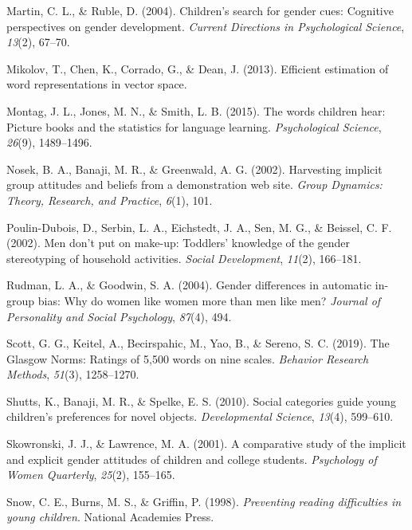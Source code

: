 \documentclass[english,,man,floatsintext]{apa6}
\begin{document}
\leavevmode\hypertarget{ref-martin2004children}{}%
Martin, C. L., \& Ruble, D. (2004). Children's search for gender cues: Cognitive perspectives on gender development. \emph{Current Directions in Psychological Science}, \emph{13}(2), 67--70.

\leavevmode\hypertarget{ref-mikolov2013efficient}{}%
Mikolov, T., Chen, K., Corrado, G., \& Dean, J. (2013). Efficient estimation of word representations in vector space.

\leavevmode\hypertarget{ref-montag2015words}{}%
Montag, J. L., Jones, M. N., \& Smith, L. B. (2015). The words children hear: Picture books and the statistics for language learning. \emph{Psychological Science}, \emph{26}(9), 1489--1496.

\leavevmode\hypertarget{ref-nosek2002harvesting}{}%
Nosek, B. A., Banaji, M. R., \& Greenwald, A. G. (2002). Harvesting implicit group attitudes and beliefs from a demonstration web site. \emph{Group Dynamics: Theory, Research, and Practice}, \emph{6}(1), 101.

\leavevmode\hypertarget{ref-poulin2002men}{}%
Poulin-Dubois, D., Serbin, L. A., Eichstedt, J. A., Sen, M. G., \& Beissel, C. F. (2002). Men don't put on make-up: Toddlers' knowledge of the gender stereotyping of household activities. \emph{Social Development}, \emph{11}(2), 166--181.

\leavevmode\hypertarget{ref-rudman2004gender}{}%
Rudman, L. A., \& Goodwin, S. A. (2004). Gender differences in automatic in-group bias: Why do women like women more than men like men? \emph{Journal of Personality and Social Psychology}, \emph{87}(4), 494.

\leavevmode\hypertarget{ref-scott2019glasgow}{}%
Scott, G. G., Keitel, A., Becirspahic, M., Yao, B., \& Sereno, S. C. (2019). The Glasgow Norms: Ratings of 5,500 words on nine scales. \emph{Behavior Research Methods}, \emph{51}(3), 1258--1270.

\leavevmode\hypertarget{ref-shutts2010social}{}%
Shutts, K., Banaji, M. R., \& Spelke, E. S. (2010). Social categories guide young children's preferences for novel objects. \emph{Developmental Science}, \emph{13}(4), 599--610.

\leavevmode\hypertarget{ref-skowronski2001comparative}{}%
Skowronski, J. J., \& Lawrence, M. A. (2001). A comparative study of the implicit and explicit gender attitudes of children and college students. \emph{Psychology of Women Quarterly}, \emph{25}(2), 155--165.

\leavevmode\hypertarget{ref-snow1998preventing}{}%
Snow, C. E., Burns, M. S., \& Griffin, P. (1998). \emph{Preventing reading difficulties in young children}. National Academies Press.
\end{document}

